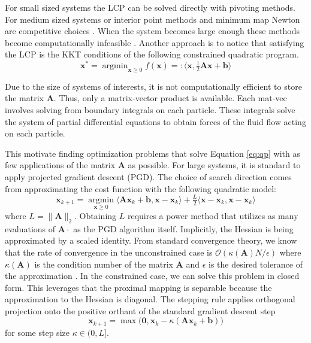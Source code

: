 \documentclass{article}
\newcommand{\x}{\mathbf{x}}
\renewcommand{\b}{\mathbf{b}}
\newcommand{\A}{\mathbf{A}}
\newcommand{\argmin}{\operatorname{argmin}}
\begin{document}


For small sized systems the LCP can be solved directly with pivoting  methods. For medium sized systems or interior point methods and minimum map Newton are competitive choices \citep{NiebeErleben2015}. When the system becomes large enough these methods become computationally infeasible \cite{yanScalableComputationalPlatform2020}. Another approach is to notice that satisfying the LCP is the KKT conditions of the following constrained quadratic program. 
\begin{equation} \label{eq:qp}
    \x^* = \argmin_{\x \geq 0 }  f(\x) =:\bigl\langle \x, \tfrac{1}{2}\A\x +\b\bigr\rangle
\end{equation}

Due to the size of systems of interests, it is not computationally efficient to store the matrix $\A$.  Thus, only a matrix-vector product is available. Each mat-vec involves solving from boundary integrals on each particle. These integrals solve the system of partial differential equations to obtain forces of the fluid flow acting on each particle. 

This motivate finding optimization problems that solve Equation \eqref{eq:qp} with as few applications of the matrix $\A$ as possible. For large systems, it is standard to apply projected gradient descent (PGD). The choice of search direction comes from approximating the cost function with the following quadratic model:
\[ \x_{k+1} = \underset{\x \geq 0}{\argmin} \langle \A \x_k + \b, \x-\x_k \rangle + \tfrac{L}{2}\langle \x-\x_k , \x-\x_k \rangle\]
where $L = \|\A\|_2$. Obtaining $L$ requires a power method that utilizes as many evaluations of $\A\cdot$ as the PGD algorithm itself. Implicitly, the Hessian is being approximated by a scaled identity. From standard convergence theory, we know that the rate of convergence in the unconstrained case is $\mathcal{O}(\kappa(\A)N /\epsilon)$ where $\kappa(\A)$ is the condition number of the matrix $\A$ and $\epsilon$ is the desired tolerance of the approximation \citep{Atkinson1989}. In the constrained case, we can solve this problem in closed form. This leverages that the proximal mapping is separable because the approximation to the Hessian is diagonal. The stepping rule applies orthogonal projection onto the positive orthant of the standard gradient descent step
\[ \x_{k+1} = \max\bigl(\mathbf{0}, \x_k - \kappa (\A \x_k + \b)\bigr)\]
for some step size $ \kappa \in (0,L]$.
\end{document}
